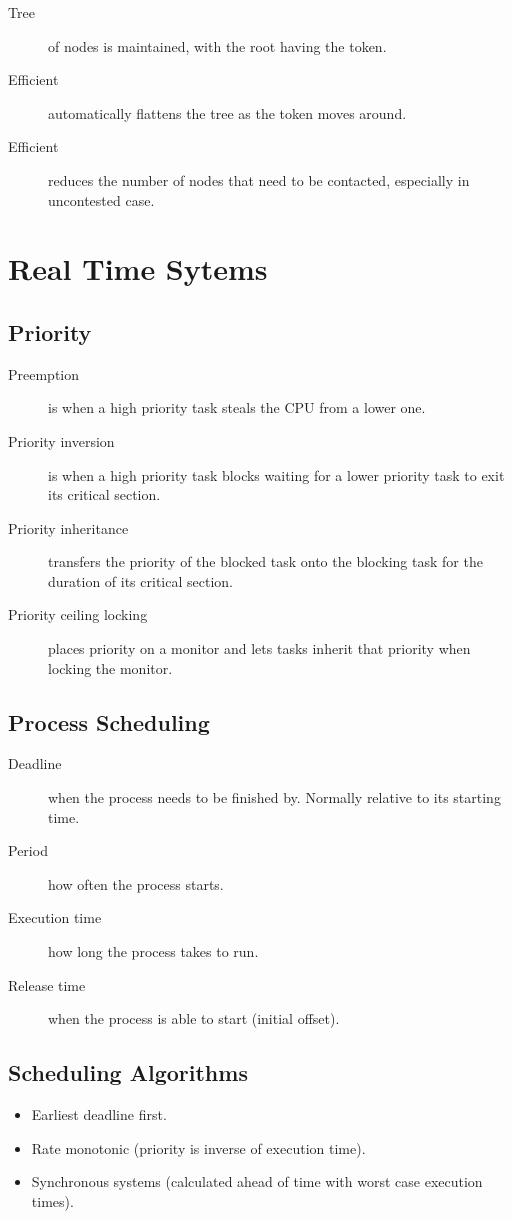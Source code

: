 \documentclass[landscape]{cheat}
\begin{document}
\begin{multicols*}{3}
\begin{description}
    \item[Tree] of nodes is maintained, with the root having the token.
    \item[Efficient] automatically flattens the tree as the token moves around.
    \item[Efficient] reduces the number of nodes that need to be contacted, especially in uncontested case.
\end{description}

\section{Real Time Sytems}

\subsection{Priority}
\begin{description}
    \item[Preemption] is when a high priority task steals the CPU from a lower one.
    \item[Priority inversion] is when a high priority task blocks waiting for a lower priority task to exit its critical section.
    \item[Priority inheritance] transfers the priority of the blocked task onto the blocking task for the duration of its critical section.
    \item[Priority ceiling locking] places priority on a monitor and lets tasks inherit that priority when locking the monitor.
\end{description}

\subsection{Process Scheduling}
\begin{description}
    \item[Deadline] when the process needs to be finished by.
        Normally relative to its starting time.
    \item[Period] how often the process starts.
    \item[Execution time] how long the process takes to run.
    \item[Release time] when the process is able to start (initial offset).
\end{description}

\subsection{Scheduling Algorithms}
\begin{itemize}
    \item Earliest deadline first.
    \item Rate monotonic (priority is inverse of execution time).
    \item Synchronous systems (calculated ahead of time with worst case execution times).
\end{itemize}


\end{multicols*}
\end{document}
